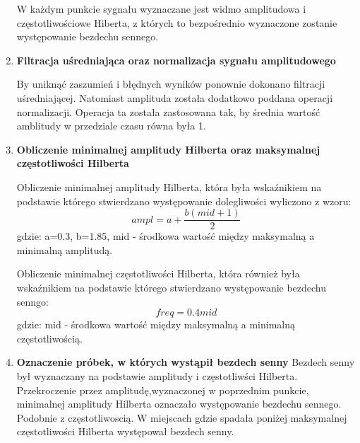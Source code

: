 \begin{enumerate}
 W każdym punkcie sygnału wyznaczane jest widmo amplitudowa i częstotliwościowe Hiberta, z których to bezpośrednio wyznaczone zostanie występowanie bezdechu sennego.
 \item \textbf{Filtracja uśredniająca oraz normalizacja sygnału amplitudowego}
 
 By uniknąć zaszumień i błędnych wyników ponownie dokonano filtracji uśredniającej. Natomiast amplituda została dodatkowo poddana operacji normalizacji. Operacja ta została zastosowana tak, by średnia wartość amblitudy w przedziale czasu równa była 1.
 \item \textbf{Obliczenie minimalnej amplitudy Hilberta oraz maksymalnej częstotliwości Hilberta}
 
 Obliczenie minimalnej amplitudy Hilberta, która była wskaźnikiem na podstawie którego stwierdzano występowanie dolegliwości wyliczono z wzoru:
 \begin{equation}
 ampl = a+\frac{b(mid +1)}{2}
 \end{equation}
  gdzie: a=0.3, b=1.85, mid - środkowa wartość między maksymalną a minimalną amplitudą.
  
 Obliczenie minimalnej częstotliwości Hilberta, która również była wskaźnikiem na podstawie którego stwierdzano występowanie bezdechu senngo:
 \begin{equation}
 freq = 0.4mid
 \end{equation}
  gdzie: mid - środkowa wartość między maksymalną a minimalną częstotliwością.
 \item \textbf{Oznaczenie próbek, w których wystąpił bezdech senny}
 Bezdech senny był wyznaczany na podstawie amplitudy i częstotliwści Hilberta. Przekroczenie przez amplitudę,wyznaczonej w poprzednim punkcie, minimalnej amplitudy Hilberta oznaczało występowanie bezdechu sennego. Podobnie z częstotliwoscią. W miejscach gdzie spadała poniżej maksymalnej częstotliwości Hilberta występował bezdech senny.
\end{enumerate}

